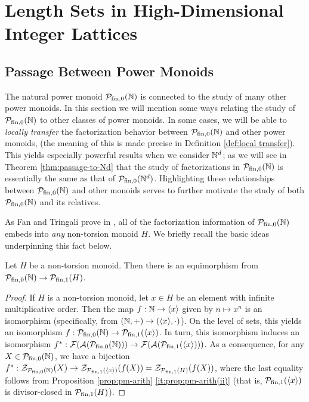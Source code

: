 
\chapter{Length Sets in High-Dimensional Integer Lattices} \label{ch:lattices}
\section{Passage Between Power Monoids}\label{sec:passage}


The natural power monoid ${\mathcal{P}_{\textrm{fin},0}(\mathbb{N})}$ is connected to the study of many other power monoids.
In this section we will mention some ways relating the study of ${\mathcal{P}_{\textrm{fin},0}(\mathbb{N})}$ to other classes of power monoids.
In some cases, we will be able to \textit{locally transfer} the factorization behavior between ${\mathcal{P}_{\textrm{fin},0}(\mathbb{N})}$ and other power monoids, (the meaning of this is made precise in Definition \ref{def:local transfer}).
This yields especially powerful results when we consider $\mathbb{N}^d$; as we will see in Theorem \ref{thm:passage-to-Nd} that the study of factorizations in ${\mathcal{P}_{\textrm{fin},0}(\mathbb{N})}$ is essentially the same as that of $\mathcal{P}_{\textrm{fin}, 0}(\mathbb{N}^d)$.
Highlighting these relationships between ${\mathcal{P}_{\textrm{fin},0}(\mathbb{N})}$ and other monoids serves to further motivate the study of both ${\mathcal{P}_{\textrm{fin},0}(\mathbb{N})}$ and its relatives.


As Fan and Tringali prove in \cite[Theorem 3.8, Theorem 4.11]{fan-tringali18}, all of the factorization information of ${\mathcal{P}_{\textrm{fin},0}(\mathbb{N})}$ embeds into \textit{any} non-torsion monoid $H$.
We briefly recall the basic ideas underpinning this fact below.

\begin{prop}\label{prop:natural-to-non-tors}
	Let $H$ be a non-torsion monoid.
	Then there is an equimorphism from ${\mathcal{P}_{\textrm{fin},0}(\mathbb{N})} \to \mathcal{P}_{\textrm{fin}, 1}(H)$.
\end{prop}
\begin{proof}
	If $H$ is a non-torsion monoid, let $x\in H$ be an element with infinite multiplicative order.  
	Then the map $f: \mathbb{N} \to \langle x \rangle$ given by $n\mapsto x^n$ is an isomorphism (specifically, from $(\mathbb{N},+)\to (\langle x \rangle,\cdot)$).
	On the level of sets, this yields an isomorphism $f: {\mathcal{P}_{\textrm{fin},0}(\mathbb{N})} \to \mathcal{P}_{\textrm{fin}, 1}(\langle x \rangle)$.
	In turn, this isomorphism induces an isomorphism $f^*: \mathcal{F}(\mathcal{A}({\mathcal{P}_{\textrm{fin},0}(\mathbb{N})})) \to \mathcal{F}(\mathcal{A}(\mathcal{P}_{\textrm{fin}, 1}(\langle x \rangle)))$.
	As a consequence, for any $X \in {\mathcal{P}_{\textrm{fin},0}(\mathbb{N})}$, we have a bijection $f^*: \mathcal{Z}_{{\mathcal{P}_{\textrm{fin},0}(\mathbb{N})}}(X) \to \mathcal{Z}_{\mathcal{P}_{\textrm{fin}, 1}(\langle x \rangle)}(f(X)) = \mathcal{Z}_{\mathcal{P}_{\textrm{fin}, 1}(H)}(f(X))$, where the last equality follows from Proposition \ref{prop:pm-arith} \ref{it:prop:pm-arith(ii)} (that is, $\mathcal{P}_{\textrm{fin}, 1}(\langle x \rangle)$ is divisor-closed in $\mathcal{P}_{\textrm{fin}, 1}(H)$).
\end{proof}

